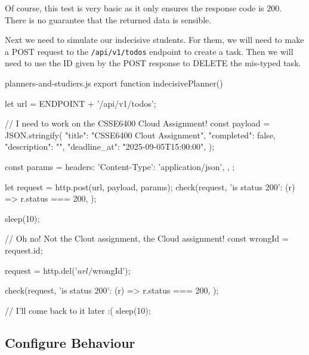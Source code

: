 \documentclass{csse4400}
\begin{document}
Of course,
this test is very basic as it only ensures the response code is 200.
There is no guarantee that the returned data is sensible.


Next we need to simulate our indecisive students.
For them, we will need to make a POST request to the \texttt{/api/v1/todos} endpoint to create a task.
Then we will need to use the ID given by the POST response to DELETE the mis-typed task.
%
\begin{code}[language=JavaScript,numbers=none]{planners-and-studiers.js}
export function indecisivePlanner() {
    let url = ENDPOINT + '/api/v1/todos';

    // I need to work on the CSSE6400 Cloud Assignment!
    const payload = JSON.stringify({
        "title": "CSSE6400 Clout Assignment",
        "completed": false,
        "description": "",
        "deadline_at": "2025-09-05T15:00:00",
    });

    const params = {
        headers: {
            'Content-Type': 'application/json',
        },
    };

    let request = http.post(url, payload, params);
    check(request, {
        'is status 200': (r) => r.status === 200,
    });

    sleep(10);

    // Oh no! Not the Clout assignment, the Cloud assignment!
    const wrongId = request.id;

    request = http.del('${url}/${wrongId}');

    check(request, {
        'is status 200': (r) => r.status === 200,
    });

    // I'll come back to it later :(
    sleep(10);
}
\end{code}

\subsection{Configure Behaviour}
\end{document}
